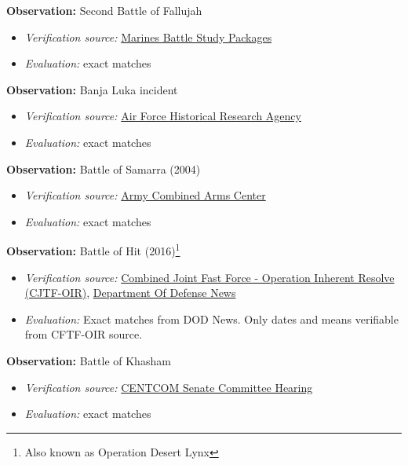 \documentclass[fleqn,12pt]{article}
\begin{document}
\textbf{Observation:} Second Battle of Fallujah
\begin{itemize}
    \item \textit{Verification source:} \href{https://www.usmcu.edu/Portals/218/FALLUJAH.pdf}{Marines Battle Study Packages}
    \item \textit{Evaluation:} exact matches
\end{itemize}

\textbf{Observation:} Banja Luka incident
\begin{itemize}
    \item \textit{Verification source:} \href{https://www.afhra.af.mil/Portals/16/documents/Airmen-at-War/Haulman-MannedAircraftLossesYugoslavia1994-1999.pdf?ver=2016-08-22-131404-383}{Air Force Historical Research Agency}
    \item \textit{Evaluation:} exact matches
\end{itemize}

\textbf{Observation:} Battle of Samarra (2004)
\begin{itemize}
    \item \textit{Verification source:} \href{https://www.armyupress.army.mil/Portals/7/combat-studies-institute/csi-books/BetweenTheRivers_McGrath.pdf}{Army Combined Arms Center}
    \item \textit{Evaluation:} exact matches
\end{itemize}

\textbf{Observation:} Battle of Hit (2016)\footnote{Also known as Operation Desert Lynx}
\begin{itemize}
    \item \textit{Verification source:} \href{https://www.inherentresolve.mil/NEWSROOM/Article/776143/oir-spokesman-attacks-in-baghdad-show-isil-reverting-to-terrorist-roots/}{Combined Joint Fast Force - Operation Inherent Resolve (CJTF-OIR)}, \href{https://media.defense.gov/2016/Jun/07/2001550104/-1/-1/0/160515-O-ZZ999-001.JPG}{Department Of Defense News}
    \item \textit{Evaluation:} Exact matches from DOD News. Only dates and means verifiable from CFTF-OIR source.
\end{itemize}

\textbf{Observation:} Battle of Khasham
\begin{itemize}
    \item \textit{Verification source:} \href{https://www.armed-services.senate.gov/imo/media/doc/22-12_03-15-2022.pdf}{CENTCOM Senate Committee Hearing}
    \item \textit{Evaluation:} exact matches
\end{itemize}
\end{document}
